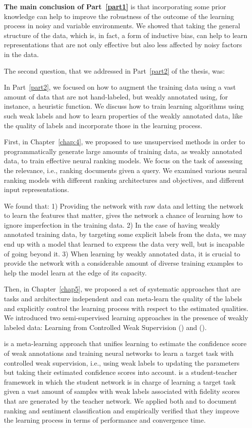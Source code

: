 \textbf{The main conclusion of Part~\ref{part1}} is that incorporating some prior knowledge can help to improve the robustness of the outcome of the learning process in noisy and variable environments. We showed that taking the general structure of the data, which is, in fact, a form of inductive bias, can help to learn representations that are not only effective but also less affected by noisy factors in the data.


The second question, that we addressed in Part~\ref{part2} of the thesis, was:
%

In Part~\ref{part2}, we focused on how to augment the training data using a vast amount of data that are not hand-labeled, but weakly annotated using, for instance, a heuristic function. We discuss how to train learning algorithms using such weak labels and how to learn properties of the weakly annotated data, like the quality of labels and incorporate those in the learning process.  

First, in Chapter~\ref{chap:4}, we proposed to use unsupervised methods in order to programmatically generate large amounts of training data, as weakly annotated data, to train effective neural ranking models. We focus on the task of assessing the relevance, i.e., ranking documents given a query. We examined various neural ranking models with different ranking architectures and objectives, and different input representations.

We found that: 1) Providing the network with raw data and letting the network to learn the features that matter, gives the network a chance of learning how to ignore imperfection in the training data. 2) In the case of having weakly annotated training data, by targeting some explicit labels from the data, we may end up with a model that learned to express the data very well, but is incapable of going beyond it. 3) When learning by weakly annotated data, it is crucial to provide the network with a considerable amount of diverse training examples to help the model learn at the edge of its capacity.

Then, in Chapter~\ref{chap5}, we proposed a set of systematic approaches that are tasks and architecture independent and can meta-learn the quality of the labels and explicitly control the learning process with respect to the estimated qualities. We introduced two semi-supervised learning approaches in the presence of weakly labeled data: Learning from Controlled Weak Supervision (\cws) and \fwlfulllc (\fwl).

\cws is a meta-learning approach that unifies learning to estimate the confidence score of weak annotations and training neural networks to learn a target task with controlled weak supervision, i.e., using weak labels to updating the parameters but taking their estimated confidence scores into account. \fwl is a student-teacher framework in which the student network is in charge of learning a target task given a vast amount of samples with weak labels associated with fidelity scores that are generated by the teacher network.  We applied both \cws and \fwl to document ranking and sentiment classification and empirically verified that they improve the learning process in terms of performance and convergence time. 

